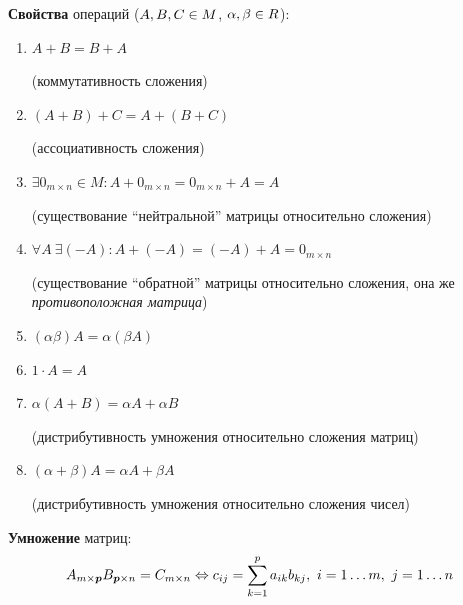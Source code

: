 \documentclass[a4paper,12pt]{article}
\begin{document}
    \textbf{Свойства} операций ($A, B, C \hm\in M$, $\alpha, \beta \hm\in R$):
    \begin{enumerate}
      \item $A + B = B + A$
      
      (коммутативность сложения)
      
      \item $(A + B) + C = A + (B + C)$
      
      (ассоциативность сложения)
      
      \item $\exists 0_{m\times n} \in M: A + 0_{m\times n} = 0_{m\times n} + A = A$
      
      (существование ``нейтральной'' матрицы относительно сложения)
      
      \item $\forall A\ \exists (-A): A + (-A) = (-A) + A = 0_{m\times n}$
      
      (существование ``обратной'' матрицы относительно сложения, она же \emph{противоположная матрица})
      
      \item $(\alpha \beta) A = \alpha (\beta A)$
      \item $1 \cdot A = A$
      \item $\alpha (A + B) = \alpha A + \alpha B$
      
      (дистрибутивность умножения относительно сложения матриц)
      
      \item $(\alpha + \beta) A = \alpha A + \beta A$
      
      (дистрибутивность умножения относительно сложения чисел)
    \end{enumerate}
    
    \textbf{Умножение} матриц:
    \[
      A_{m\times \boldsymbol p} B_{\boldsymbol p \times n} = C_{m\times n} \Leftrightarrow c_{ij} = \sum\limits_{k = 1}^p a_{ik} b_{kj},\ i = 1 \ldots m,\ j = 1 \ldots n
    \]
    
\end{document}

